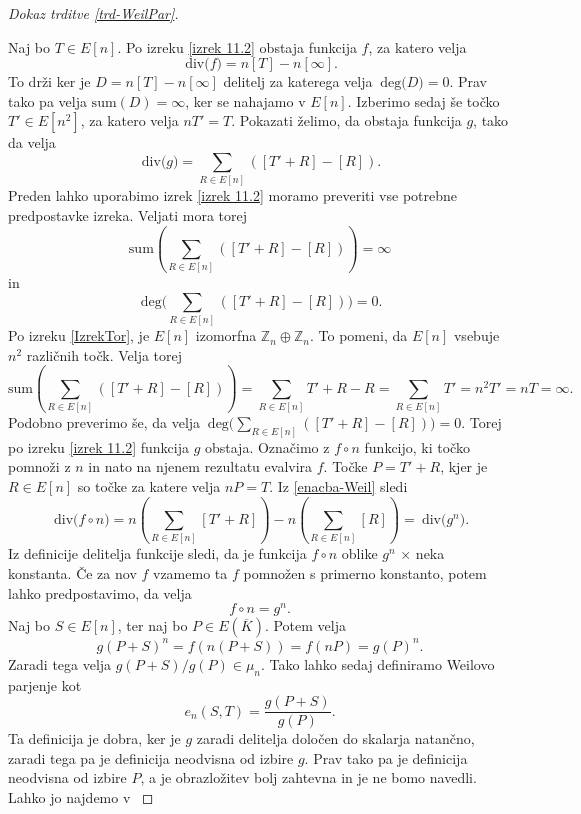 \documentclass[12pt,a4paper,twoside]{article}
\theoremstyle{definition} %
\theoremstyle{plain} %
\numberwithin{equation}{section}  %
\newcommand{\E}[1]{E({#1})}
\newcommand{\DEG}[1]{\ \text{deg(}{#1}\text{)}}
\newcommand{\Div}[1]{\ \text{div(}{#1}\text{)}}
\begin{document}
\begin{proof}[Dokaz trditve \ref{trd-WeilPar}]~

Naj bo $T \in E[n]$.
Po izreku \ref{izrek 11.2} obstaja funkcija $f$, za katero velja
\begin{equation}
\label{enacba-Weil}
\Div{f} = n[T]-n[\infty].
\end{equation}
To drži ker je $D = n[T]-n[\infty]$ delitelj za katerega velja $\DEG{D} = 0$. Prav tako pa velja $\text{sum}(D) = \infty$, ker se nahajamo v $E[n]$.
Izberimo sedaj še točko $T' \in E[n^2]$, za katero velja $nT' = T$. Pokazati želimo, da obstaja funkcija $g$, tako da velja
$$\Div{g} = \sum_{R \in E[n]}([T' + R]- [R]).$$
Preden lahko uporabimo izrek \ref{izrek 11.2} moramo preveriti vse potrebne predpostavke izreka. Veljati mora torej 
$$\text{sum}( \sum_{R \in E[n]}([T' + R]- [R])) = \infty$$
 in
 $$\DEG{ \sum_{R \in E[n]}([T' + R]- [R])} = 0.$$
Po izreku \ref{IzrekTor}, je $E[n]$ izomorfna $\mathbb{Z}_n \oplus \mathbb{Z}_n$. To pomeni, da $E[n]$ vsebuje $n^2$ različnih točk. Velja torej
$$\text{sum}(\sum_{R \in E[n]}([T' + R]- [R])) = \sum_{R \in E[n]} T' +R-R = \sum_{R \in E[n]} T' = n^2T' = nT = \infty.$$
Podobno preverimo še, da velja $\DEG{\sum_{R \in E[n]}([T' + R]- [R])} = 0.$ Torej po izreku \ref{izrek 11.2} funkcija $g$ obstaja.
Označimo z $f \circ n$ funkcijo, ki točko pomnoži z $n$ in nato na njenem rezultatu evalvira $f$. Točke $P = T' + R$, kjer je $R\in E[n]$ so točke za katere velja $nP=T$. Iz \ref{enacba-Weil}
sledi
$$\Div{f \circ n} = n(\sum_{R \in E[n]}[T' + R]) - n(\sum_{R \in E[n]}[R]) = \Div{g^n}.$$
Iz definicije delitelja funkcije sledi, da je funkcija $f \circ n$ oblike $g^n$ $\times$ neka konstanta. Če za nov $f$ vzamemo ta $f$ pomnožen s primerno konstanto, potem lahko predpostavimo, da velja
$$f \circ n = g^n.$$
Naj bo $S \in E[n]$, ter naj bo $P \in \E{\overline{K}}$. Potem velja
$$g(P+S)^n = f(n(P+S)) = f(nP) = g(P)^n.$$
Zaradi tega velja $g(P+S)/g(P) \in \mu_n$.
Tako lahko sedaj definiramo Weilovo parjenje kot
$$e_n(S,T) = \frac{g(P+S)}{g(P)}.$$
Ta definicija je dobra, ker je $g$ zaradi delitelja določen do skalarja natančno, zaradi tega pa je definicija neodvisna od izbire $g$. Prav tako pa je definicija neodvisna od izbire $P$, a je obrazložitev bolj zahtevna in je ne bomo navedli. Lahko jo najdemo v \cite{Silverman2009}


\end{proof}
\end{document}
